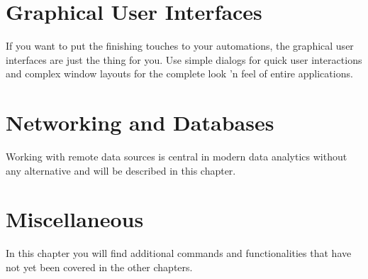 \documentclass[DIV=17, parskip=half]{scrreprt}
\begin{document}
	\chapter{Graphical User Interfaces}
		If you want to put the finishing touches to your automations, the graphical user interfaces are just the thing for you. Use simple dialogs for quick user interactions and complex window layouts for the complete look 'n feel of entire applications.
		
		
	
	\chapter{Networking and Databases}
		Working with remote data sources is central in modern data analytics without any alternative and will be described in this chapter.
		
		
		
	\chapter{Miscellaneous}
		In this chapter you will find additional commands and functionalities that have not yet been covered in the other chapters.
		
		
		
		
		
\end{document}
